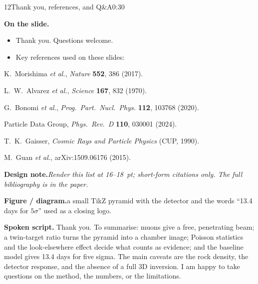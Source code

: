 \documentclass[11pt,a4paper]{article}
\newcommand{\onslide}{\par\smallskip\noindent\textbf{On the slide.}\;}
\newcommand{\figlabel}{\par\smallskip\noindent\textbf{Figure / diagram.}\;}
\newcommand{\spoken}{\par\smallskip\noindent\textbf{Spoken script.}\;}
\newcommand{\designnote}{\par\smallskip\noindent\textbf{Design note.}\;\itshape}
\begin{document}
\newpage
\begin{slidebox}{12}{Thank you, references, and Q\&A}{0:30}
\onslide
\begin{itemize}
  \item Thank you. Questions welcome.
  \item Key references used on these slides:
\end{itemize}
\small
\begin{enumerate}[label={[\arabic*]}]
  \item K.~Morishima \textit{et al.}, \textit{Nature} \textbf{552}, 386 (2017).
  \item L.~W.~Alvarez \textit{et al.}, \textit{Science} \textbf{167}, 832 (1970).
  \item G.~Bonomi \textit{et al.}, \textit{Prog.\ Part.\ Nucl.\ Phys.}
        \textbf{112}, 103768 (2020).
  \item Particle Data Group, \textit{Phys.\ Rev.\ D} \textbf{110}, 030001
        (2024).
  \item T.~K.~Gaisser, \textit{Cosmic Rays and Particle Physics} (CUP, 1990).
  \item M.~Guan \textit{et al.}, arXiv:1509.06176 (2015).
\end{enumerate}
\designnote Render this list at 16--18~pt; short-form citations only. The full
bibliography is in the paper.
\figlabel a small TikZ pyramid with the detector and the words
``13.4 days for $5\sigma$'' used as a closing logo.
\begin{center}
\end{center}
\spoken
Thank you. To summarise: muons give a free, penetrating beam; a twin-target
ratio turns the pyramid into a chamber image; Poisson statistics and the
look-elsewhere effect decide what counts as evidence; and the baseline model
gives 13.4 days for five sigma. The main caveats are the rock density, the
detector response, and the absence of a full 3D inversion. I am happy to take
questions on the method, the numbers, or the limitations.
\end{slidebox}
\end{document}
